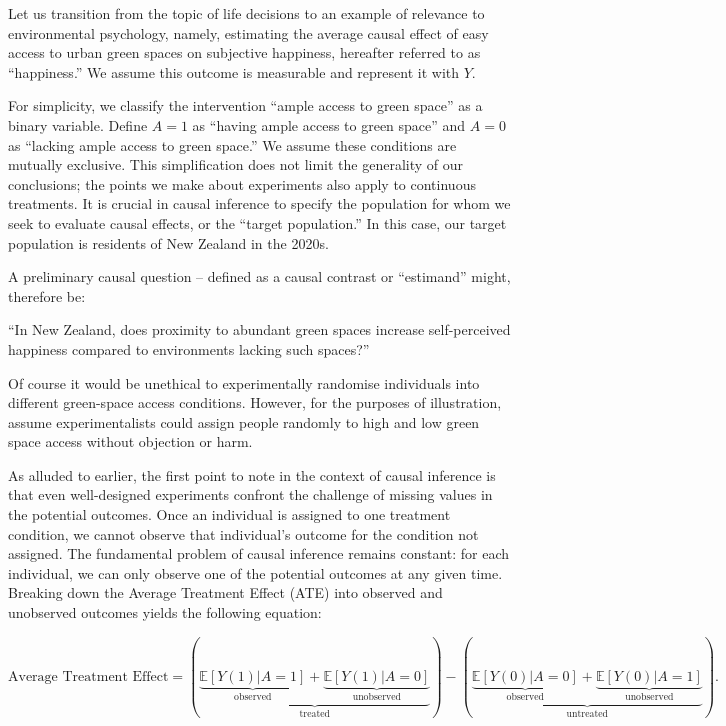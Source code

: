 \documentclass[
  singlecolumn]{article}
\begin{document}
Let us transition from the topic of life decisions to an example of
relevance to environmental psychology, namely, estimating the average
causal effect of easy access to urban green spaces on subjective
happiness, hereafter referred to as ``happiness.'' We assume this
outcome is measurable and represent it with \(Y\).

For simplicity, we classify the intervention ``ample access to green
space'' as a binary variable. Define \(A = 1\) as ``having ample access
to green space'' and \(A = 0\) as ``lacking ample access to green
space.'' We assume these conditions are mutually exclusive. This
simplification does not limit the generality of our conclusions; the
points we make about experiments also apply to continuous treatments. It
is crucial in causal inference to specify the population for whom we
seek to evaluate causal effects, or the ``target population.'' In this
case, our target population is residents of New Zealand in the 2020s.

A preliminary causal question -- defined as a causal contrast or
``estimand'' might, therefore be:

``In New Zealand, does proximity to abundant green spaces increase
self-perceived happiness compared to environments lacking such spaces?''

Of course it would be unethical to experimentally randomise individuals
into different green-space access conditions. However, for the purposes
of illustration, assume experimentalists could assign people randomly to
high and low green space access without objection or harm.

As alluded to earlier, the first point to note in the context of causal
inference is that even well-designed experiments confront the challenge
of missing values in the potential outcomes. Once an individual is
assigned to one treatment condition, we cannot observe that individual's
outcome for the condition not assigned. The fundamental problem of
causal inference remains constant: for each individual, we can only
observe one of the potential outcomes at any given time. Breaking down
the Average Treatment Effect (ATE) into observed and unobserved outcomes
yields the following equation:

\[
\text{Average Treatment Effect} = \left(\underbrace{\underbrace{\mathbb{E}[Y(1)|A = 1]}_{\text{observed}} + \underbrace{\mathbb{E}[Y(1)|A = 0]}_{\text{unobserved}}}_{\text{treated}}\right) - \left(\underbrace{\underbrace{\mathbb{E}[Y(0)|A = 0]}_{\text{observed}} + \underbrace{\mathbb{E}[Y(0)|A = 1]}_{\text{unobserved}}}_{\text{untreated}}\right).
\]
\end{document}
